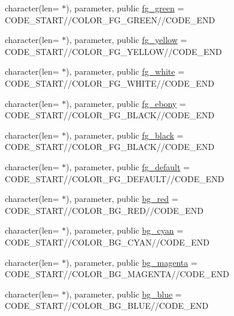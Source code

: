 \begin{DoxyCompactItemize}
\item 
character(len= $\ast$), parameter, public \mbox{\hyperlink{namespacem__escape_a1ada5ca3807f86e47be0b48c41e410c7}{fg\+\_\+green}} = C\+O\+D\+E\+\_\+\+S\+T\+A\+RT//C\+O\+L\+O\+R\+\_\+\+F\+G\+\_\+\+G\+R\+E\+EN//C\+O\+D\+E\+\_\+\+E\+ND
\item 
character(len= $\ast$), parameter, public \mbox{\hyperlink{namespacem__escape_a9902f29abc8261843e6b317cd07368ec}{fg\+\_\+yellow}} = C\+O\+D\+E\+\_\+\+S\+T\+A\+RT//C\+O\+L\+O\+R\+\_\+\+F\+G\+\_\+\+Y\+E\+L\+L\+OW//C\+O\+D\+E\+\_\+\+E\+ND
\item 
character(len= $\ast$), parameter, public \mbox{\hyperlink{namespacem__escape_adde79fd804c7dffee08721f5a360345c}{fg\+\_\+white}} = C\+O\+D\+E\+\_\+\+S\+T\+A\+RT//C\+O\+L\+O\+R\+\_\+\+F\+G\+\_\+\+W\+H\+I\+TE//C\+O\+D\+E\+\_\+\+E\+ND
\item 
character(len= $\ast$), parameter, public \mbox{\hyperlink{namespacem__escape_a7b93e25003e389c21833a5ca8605d2de}{fg\+\_\+ebony}} = C\+O\+D\+E\+\_\+\+S\+T\+A\+RT//C\+O\+L\+O\+R\+\_\+\+F\+G\+\_\+\+B\+L\+A\+CK//C\+O\+D\+E\+\_\+\+E\+ND
\item 
character(len= $\ast$), parameter, public \mbox{\hyperlink{namespacem__escape_af2f18b52e294d4b9f312369d9e29421b}{fg\+\_\+black}} = C\+O\+D\+E\+\_\+\+S\+T\+A\+RT//C\+O\+L\+O\+R\+\_\+\+F\+G\+\_\+\+B\+L\+A\+CK//C\+O\+D\+E\+\_\+\+E\+ND
\item 
character(len= $\ast$), parameter, public \mbox{\hyperlink{namespacem__escape_a518f003512a7505cb8bf9585c103900e}{fg\+\_\+default}} = C\+O\+D\+E\+\_\+\+S\+T\+A\+RT//C\+O\+L\+O\+R\+\_\+\+F\+G\+\_\+\+D\+E\+F\+A\+U\+LT//C\+O\+D\+E\+\_\+\+E\+ND
\item 
character(len= $\ast$), parameter, public \mbox{\hyperlink{namespacem__escape_a3cd9ef6cdd5ab3dda36cc9402dff0806}{bg\+\_\+red}} = C\+O\+D\+E\+\_\+\+S\+T\+A\+RT//C\+O\+L\+O\+R\+\_\+\+B\+G\+\_\+\+R\+ED//C\+O\+D\+E\+\_\+\+E\+ND
\item 
character(len= $\ast$), parameter, public \mbox{\hyperlink{namespacem__escape_a7b7a979cd6dc44533f962d323c65a7b6}{bg\+\_\+cyan}} = C\+O\+D\+E\+\_\+\+S\+T\+A\+RT//C\+O\+L\+O\+R\+\_\+\+B\+G\+\_\+\+C\+Y\+AN//C\+O\+D\+E\+\_\+\+E\+ND
\item 
character(len= $\ast$), parameter, public \mbox{\hyperlink{namespacem__escape_aaf244507d267d0ae99ea933a8744c7e4}{bg\+\_\+magenta}} = C\+O\+D\+E\+\_\+\+S\+T\+A\+RT//C\+O\+L\+O\+R\+\_\+\+B\+G\+\_\+\+M\+A\+G\+E\+N\+TA//C\+O\+D\+E\+\_\+\+E\+ND
\item 
character(len= $\ast$), parameter, public \mbox{\hyperlink{namespacem__escape_afab2229302287eaa0eb05add07bb6621}{bg\+\_\+blue}} = C\+O\+D\+E\+\_\+\+S\+T\+A\+RT//C\+O\+L\+O\+R\+\_\+\+B\+G\+\_\+\+B\+L\+UE//C\+O\+D\+E\+\_\+\+E\+ND

\end{DoxyCompactItemize}
